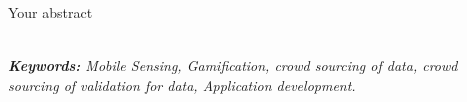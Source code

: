 Your abstract

~\\
\noindent \textit{\textbf{Keywords:} Mobile Sensing, Gamification, crowd sourcing of data, crowd sourcing of validation for data, Application development.}